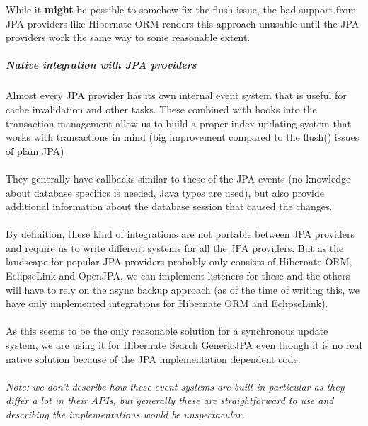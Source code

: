 \noindent
While it \textbf{might} be possible to somehow fix the flush issue, the bad support from JPA providers like Hibernate ORM renders this approach unusable until the JPA providers work the same way to some reasonable extent.

\pagebreak

\subparagraph{Native integration with JPA providers}

Almost every JPA provider has its own internal event system that is useful for cache invalidation and other tasks. These combined with hooks into the transaction management allow us to build a proper index updating system that works with transactions in mind (big improvement compared to the flush() issues of plain JPA)
\\\\
They generally have callbacks similar to these of the JPA events (no knowledge about database specifics is needed, Java types are used), but also provide additional information about the database session that caused the changes.
\\\\
By definition, these kind of integrations are not portable between JPA providers and require us to write different systems for all the JPA providers. But as the landscape for popular JPA providers probably only consists of Hibernate ORM, EclipseLink and OpenJPA, we can implement listeners for these and the others will have to rely on the async backup approach (as of the time of writing this, we have only implemented integrations for Hibernate ORM and EclipseLink).
\\\\
As this seems to be the only reasonable solution for a synchronous update system, we are using it for Hibernate Search GenericJPA even though it is no real native solution because of the JPA implementation dependent code.
\\\\
\textit{Note: we don't describe how these event systems are built in particular as they differ a lot in their APIs, but generally these are straightforward to use and describing the implementations would be unspectacular.}

\pagebreak


